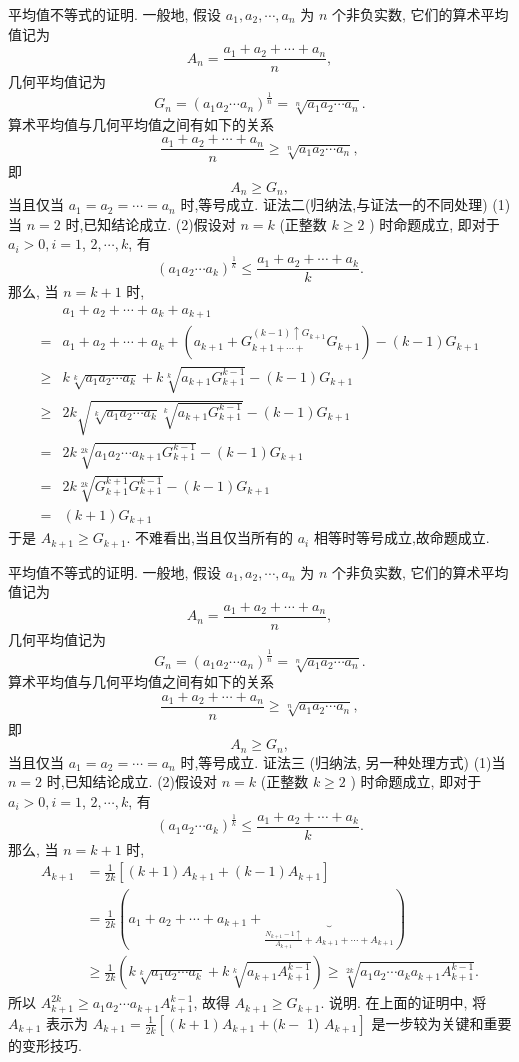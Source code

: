 平均值不等式的证明.
一般地, 假设 $a_1, a_2, \cdots, a_n$ 为 $n$ 个非负实数, 它们的算术平均值记为
$$
A_n=\frac{a_1+a_2+\cdots+a_n}{n},
$$
几何平均值记为
$$
G_n=\left(a_1 a_2 \cdots a_n\right)^{\frac{1}{n}}=\sqrt[n]{a_1 a_2 \cdots a_n} .
$$
算术平均值与几何平均值之间有如下的关系
$$
\frac{a_1+a_2+\cdots+a_n}{n} \geqslant \sqrt[n]{a_1 a_2 \cdots a_n},
$$
即
$$
A_n \geqslant G_n,
$$
当且仅当 $a_1=a_2=\cdots=a_n$ 时,等号成立.
证法二(归纳法,与证法一的不同处理)
(1)当 $n=2$ 时,已知结论成立.
(2)假设对 $n=k$ (正整数 $k \geqslant 2$ ) 时命题成立, 即对于 $a_i>0, i=1$, $2, \cdots, k$, 有
$$
\left(a_1 a_2 \cdots a_k\right)^{\frac{1}{k}} \leqslant \frac{a_1+a_2+\cdots+a_k}{k} .
$$
那么, 当 $n=k+1$ 时,
$$
\begin{aligned}
& a_1+a_2+\cdots+a_k+a_{k+1} \\
= & a_1+a_2+\cdots+a_k+\left(a_{k+1}+G_{k+1+\cdots+}^{(k-1) \uparrow G_{k+1}} G_{k+1}\right)-(k-1) G_{k+1} \\
\geqslant & k \sqrt[k]{a_1 a_2 \cdots a_k}+k \sqrt[k]{a_{k+1} G_{k+1}^{k-1}}-(k-1) G_{k+1} \\
\geqslant & 2 k \sqrt{\sqrt[k]{a_1 a_2 \cdots a_k} \sqrt[k]{a_{k+1} G_{k+1}^{k-1}}}-(k-1) G_{k+1} \\
= & 2 k \sqrt[2 k]{a_1 a_2 \cdots a_{k+1} G_{k+1}^{k-1}}-(k-1) G_{k+1} \\
= & 2 k \sqrt[2 k]{G_{k+1}^{k+1} G_{k+1}^{k-1}}-(k-1) G_{k+1} \\
= & (k+1) G_{k+1}
\end{aligned}
$$
于是 $A_{k+1} \geqslant G_{k+1}$.
不难看出,当且仅当所有的 $a_i$ 相等时等号成立,故命题成立.



平均值不等式的证明.
一般地, 假设 $a_1, a_2, \cdots, a_n$ 为 $n$ 个非负实数, 它们的算术平均值记为
$$
A_n=\frac{a_1+a_2+\cdots+a_n}{n},
$$
几何平均值记为
$$
G_n=\left(a_1 a_2 \cdots a_n\right)^{\frac{1}{n}}=\sqrt[n]{a_1 a_2 \cdots a_n} .
$$
算术平均值与几何平均值之间有如下的关系
$$
\frac{a_1+a_2+\cdots+a_n}{n} \geqslant \sqrt[n]{a_1 a_2 \cdots a_n},
$$
即
$$
A_n \geqslant G_n,
$$
当且仅当 $a_1=a_2=\cdots=a_n$ 时,等号成立.
证法三 (归纳法, 另一种处理方式)
(1)当 $n=2$ 时,已知结论成立.
(2)假设对 $n=k$ (正整数 $k \geqslant 2$ ) 时命题成立, 即对于 $a_i>0, i=1$, $2, \cdots, k$, 有
$$
\left(a_1 a_2 \cdots a_k\right)^{\frac{1}{k}} \leqslant \frac{a_1+a_2+\cdots+a_k}{k} .
$$
那么, 当 $n=k+1$ 时,
$$
\begin{aligned}
A_{k+1} & =\frac{1}{2 k}\left[(k+1) A_{k+1}+(k-1) A_{k+1}\right] \\
& =\frac{1}{2 k}(a_1+a_2+\cdots+a_{k+1}+\underbrace{}_{\frac{N_{k+1}-1 \uparrow}{A_{k+1}}+A_{k+1}+\cdots+A_{k+1}}) \\
& \geqslant \frac{1}{2 k}\left(k \sqrt[k]{a_1 a_2 \cdots a_k}+k \sqrt[k]{a_{k+1} A_{k+1}^{k-1}}\right) \geqslant \sqrt[2 k]{a_1 a_2 \cdots a_k a_{k+1} A_{k+1}^{k-1}} .
\end{aligned}
$$
所以 $A_{k+1}^{2 k} \geqslant a_1 a_2 \cdots a_{k+1} A_{k+1}^{k-1}$, 故得 $A_{k+1} \geqslant G_{k+1}$.
说明.
在上面的证明中, 将 $A_{k+1}$ 表示为 $A_{k+1}=\frac{1}{2 k}\left[(k+1) A_{k+1}+(k-\right.$ 1) $\left.A_{k+1}\right]$ 是一步较为关键和重要的变形技巧.



